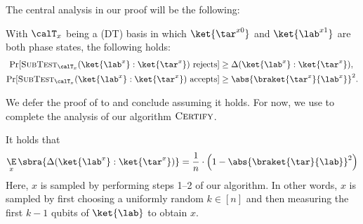 The central analysis in our proof will be the following:
\begin{theorem} \label{thm:subtest}
        With $\calT_x$ being a (DT) basis in which $\ket{\tar^{x0}}$ and $\ket{\lab^{x1}}$ are both phase states, %
        the following holds:
     \begin{align}
         \Pr[\textsc{SubTest}_{\calT_x}(\ket{\lab^x} : \ket{\smash{\tar^x}}) \text{ rejects}] %
         &\geq \Delta(\ket{\lab^x}: \ket{\tar^x}), \label{eqn:reject}\\
         \Pr[\textsc{SubTest}_{\calT_x}(\ket{\lab^x} : \ket{\tar^x}) \text{ accepts}]
         &\geq \abs{\braket{\tar^x}{\lab^x}}^2. \label{eqn:accept}
     \end{align}
\end{theorem}
We defer the proof of  to  and conclude assuming it holds. For now, we use  to complete the analysis of our algorithm $\textsc{Certify}$. 

\begin{proposition}
    It holds that
    \[
        \mathop{\E}_{x} \sbra{ \Delta(\ket{\lab^x}: \ket{\tar^x}) } = \frac1n\cdot \left(1- \abs{\braket{\tar}{\lab}}^2 \right)
    \]
    Here, $x$ is sampled by performing steps 1--2 of our algorithm. In other words, $x$ is sampled by first choosing a uniformly random $k \in [n]$ and then measuring the first $k-1$ qubits of $\ket{\lab}$ to obtain $x$. 
\end{proposition}

